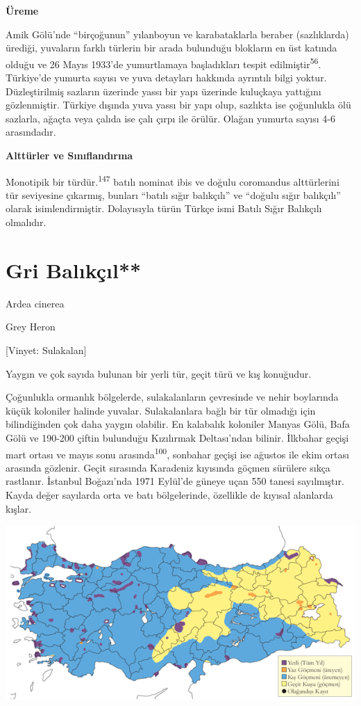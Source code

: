 \documentclass[
  letterpaper,
  DIV=11,
  numbers=noendperiod]{scrreprt}
\begin{document}
\textbf{Üreme}

Amik Gölü'nde ``birçoğunun'' yılanboyun ve karabataklarla beraber
(sazlıklarda) ürediği, yuvaların farklı türlerin bir arada bulunduğu
blokların en üst katında olduğu ve 26 Mayıs 1933'de yumurtlamaya
başladıkları tespit edilmiştir\textsuperscript{56}. Türkiye'de yumurta
sayısı ve yuva detayları hakkında ayrıntılı bilgi yoktur. Düzleştirilmiş
sazların üzerinde yassı bir yapı üzerinde kuluçkaya yattığını
gözlenmiştir. Türkiye dışında yuva yassı bir yapı olup, sazlıkta ise
çoğunlukla ölü sazlarla, ağaçta veya çalıda ise çalı çırpı ile örülür.
Olağan yumurta sayısı 4-6 arasındadır.

\textbf{Alttürler ve Sınıflandırma}

Monotipik bir türdür.\textsuperscript{147} batılı nominat ibis ve doğulu
coromandus alttürlerini tür seviyesine çıkarmış, bunları ``batılı sığır
balıkçılı'' ve ``doğulu sığır balıkçılı'' olarak isimlendirmiştir.
Dolayısıyla türün Türkçe ismi Batılı Sığır Balıkçılı olmalıdır.

\section{Gri Balıkçıl**}\label{gri-balux131kuxe7ux131l}

Ardea cinerea

Grey Heron

{[}Vinyet: Sulakalan{]}

Yaygın ve çok sayıda bulunan bir yerli tür, geçit türü ve kış konuğudur.

Çoğunlukla ormanlık bölgelerde, sulakalanların çevresinde ve nehir
boylarında küçük koloniler halinde yuvalar. Sulakalanlara bağlı bir tür
olmadığı için bilindiğinden çok daha yaygın olabilir. En kalabalık
koloniler Manyas Gölü, Bafa Gölü ve 190-200 çiftin bulunduğu Kızılırmak
Deltası'ndan bilinir. İlkbahar geçişi mart ortası ve mayıs sonu
arasında\textsuperscript{100}, sonbahar geçişi ise ağustos ile ekim
ortası arasında gözlenir. Geçit sırasında Karadeniz kıyısında göçmen
sürülere sıkça rastlanır. İstanbul Boğazı'nda 1971 Eylül'de güneye uçan
550 tanesi sayılmıştır. Kayda değer sayılarda orta ve batı bölgelerinde,
özellikle de kıyısal alanlarda kışlar.

\includegraphics{images/harita_Page_069.png}
\end{document}
